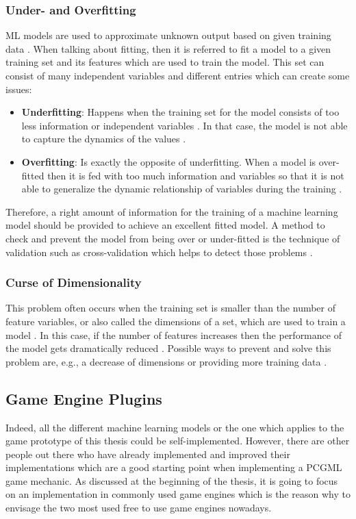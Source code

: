 \documentclass[MGS,Master,english]{twbook}%
\begin{document}
\subsubsection{Under- and Overfitting}
ML models are used to approximate unknown output based on given training data \cite{ml::book::algorithms}. When talking about fitting, then it is referred to fit a model to a given training set and its features which are used to train the model. This set can consist of many independent variables and different entries which can create some issues:
\begin{itemize}
	\item \textbf{Underfitting}: Happens when the training set for the model consists of too less information or independent variables \cite{ml::book::algorithms}. In that case, the model is not able to capture the dynamics of the values \cite{ml::book::algorithms}.
	\item \textbf{Overfitting}: Is exactly the opposite of underfitting. When a model is over-fitted then it is fed with too much information and variables so that it is not able to generalize the dynamic relationship of variables during the training \cite{ml::book::algorithms}.
\end{itemize}
Therefore, a right amount of information for the training of a machine learning model should be provided to achieve an excellent fitted model. A method to check and prevent the model from being over or under-fitted is the technique of validation such as cross-validation which helps to detect those problems \cite{ml::book::algorithms}.

\subsubsection{Curse of Dimensionality}
This problem often occurs when the training set is smaller than the number of feature variables, or also called the dimensions of a set, which are used to train a model \cite{ml::book::algorithms}. In this case, if the number of features increases then the performance of the model gets dramatically reduced \cite{ml::book::algorithms}. Possible ways to prevent and solve this problem are, e.g., a decrease of dimensions or providing more training data \cite{ml::book::algorithms}.

\subsection{Game Engine Plugins} \label{chapter::mlPluginsGameEngines}
Indeed, all the different machine learning models or the one which applies to the game prototype of this thesis could be self-implemented. However, there are other people out there who have already implemented and improved their implementations which are a good starting point when implementing a PCGML game mechanic. As discussed at the beginning of the thesis, it is going to focus on an implementation in commonly used game engines which is the reason why to envisage the two most used free to use game engines nowadays.
\end{document}
